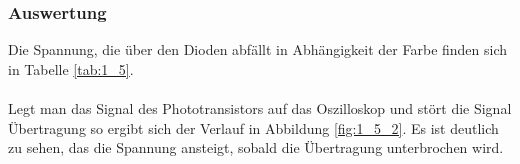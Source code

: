 \documentclass[12pt,a4paper]{article}
\begin{document}
\subsubsection*{Auswertung}

Die Spannung, die über den Dioden abfällt in Abhängigkeit der Farbe finden sich in Tabelle \ref{tab:1_5}.
\\ 
\\
Legt man das Signal des Phototransistors auf das Oszilloskop und stört die Signal Übertragung so ergibt sich der Verlauf in Abbildung \ref{fig:1_5_2}. Es ist deutlich zu sehen, das die Spannung ansteigt, sobald die Übertragung unterbrochen wird.
\end{document}
